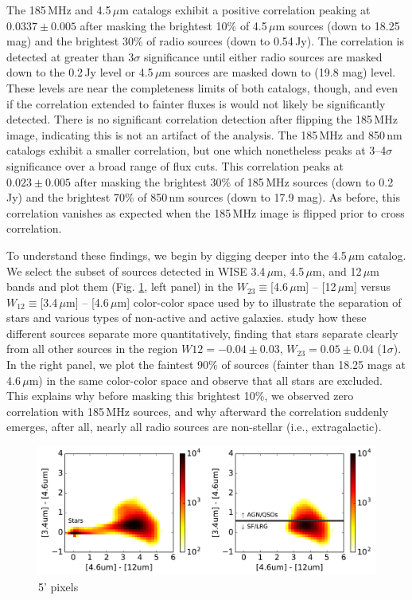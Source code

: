 \documentclass[preprint]{aastex}
\begin{document}
The 185\,MHz and 4.5\,$\mu$m catalogs exhibit a positive correlation peaking at $0.0337\pm0.005$ after masking the brightest 10\% of 4.5\,$\mu$m sources (down to 18.25 mag) and the brightest 30\% of radio sources (down to 0.54\,Jy). The correlation is detected at greater than $3\sigma$ significance until either radio sources are masked down to the 0.2\,Jy level or 4.5\,$\mu$m sources are masked down to (19.8 mag) level. These levels are near the completeness limits of both catalogs, though, and even if the correlation extended to fainter fluxes is would not likely be significantly detected. There is no significant correlation detection after flipping the 185\,MHz image, indicating this is not an artifact of the analysis. The 185\,MHz and 850\,nm catalogs exhibit a smaller correlation, but one which nonetheless peaks at 3--4$\sigma$ significance over a broad range of flux cuts. This correlation peaks at $0.023\pm0.005$ after masking the brightest 30\% of 185\,MHz sources (down to 0.2\,Jy) and the brightest 70\% of 850\,nm sources (down to 17.9 mag). As before, this correlation vanishes as expected when the 185\,MHz image is flipped prior to cross correlation.

To understand these findings, we begin by digging deeper into the 4.5\,$\mu$m catalog. We select the subset of sources detected in WISE 3.4\,$\mu$m, 4.5\,$\mu$m, and 12\,$\mu$m bands and plot them (Fig. \ref{fig:wisecolorcolor}, left panel) in the $W_{23}\equiv$[4.6\,$\mu$m] -- [12\,$\mu$m] versus $W_{12}\equiv$[3.4\,$\mu$m] -- [4.6\,$\mu$m] color-color space used by \citet{Wright2010} to illustrate the separation of stars and various types of non-active and active galaxies. \citet{nikutta14} study how these different sources separate more quantitatively, finding that stars separate clearly from all other sources in the region $W{12}=-0.04\pm0.03$, $W_{23}=0.05\pm0.04$ (1$\sigma$). In the right panel, we plot the faintest 90\% of sources (fainter than 18.25 mags at 4.6\,$\mu$m) in the same color-color space and observe that all stars are excluded. This explains why before masking this brightest 10\%, we observed zero correlation with 185\,MHz sources, and why afterward the correlation suddenly emerges, after all, nearly all radio sources are non-stellar (i.e., extragalactic). 

\begin{figure}[h]
\centering
\includegraphics[width=6in]{images/wise_color_color_figure.pdf}
\caption{5' pixels}
\label{fig:wisecolorcolor}
\end{figure}
\end{document}
